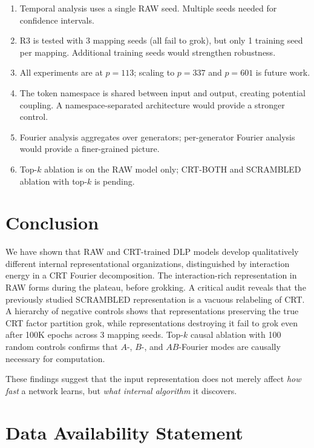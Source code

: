 \documentclass[11pt,a4paper]{article}
\theoremstyle{definition}
\theoremstyle{remark}
\begin{document}
\begin{enumerate}[leftmargin=*]
    \item Temporal analysis uses a single RAW seed. Multiple seeds needed for confidence intervals.
    \item R3 is tested with 3 mapping seeds (all fail to grok), but only 1 training seed per mapping. Additional training seeds would strengthen robustness.
    \item All experiments are at $p=113$; scaling to $p=337$ and $p=601$ is future work.
    \item The token namespace is shared between input and output, creating potential coupling. A namespace-separated architecture would provide a stronger control.
    \item Fourier analysis aggregates over generators; per-generator Fourier analysis would provide a finer-grained picture.
    \item Top-$k$ ablation is on the RAW model only; CRT-BOTH and SCRAMBLED ablation with top-$k$ is pending.
\end{enumerate}

\section{Conclusion}

We have shown that RAW and CRT-trained DLP models develop qualitatively different internal representational organizations, distinguished by interaction energy in a CRT Fourier decomposition. The interaction-rich representation in RAW forms during the plateau, before grokking. A critical audit reveals that the previously studied SCRAMBLED representation is a vacuous relabeling of CRT. A hierarchy of negative controls shows that representations preserving the true CRT factor partition grok, while representations destroying it fail to grok even after 100K epochs across 3 mapping seeds. Top-$k$ causal ablation with 100 random controls confirms that $A$-, $B$-, and $AB$-Fourier modes are causally necessary for computation.

These findings suggest that the input representation does not merely affect \emph{how fast} a network learns, but \emph{what internal algorithm} it discovers.

\section*{Data Availability Statement}
\end{document}
